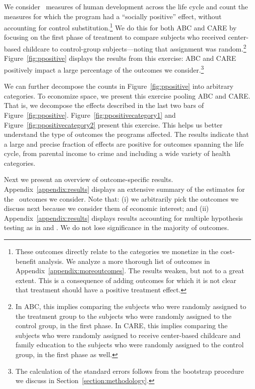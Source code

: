We consider \noutcomes\ measures of human development across the life cycle and count the measures for which the program had a ``socially positive'' effect, without accounting for control substitution.\footnote{These outcomes directly relate to the categories we monetize in the cost-benefit analysis. We analyze a more thorough list of outcomes in Appendix~\ref{appendix:moreoutcomes}. The results weaken, but not to a great extent. This is a consequence of adding outcomes for which it is not clear that treatment should have a positive treatment effect.} We do this for both ABC and CARE by focusing on the first phase of treatment to compare subjects who received center-based childcare to control-group subjects---noting that assignment was random.\footnote{In ABC, this implies comparing the subjects who were randomly assigned to the treatment group to the subjects who were randomly assigned to the control group, in the first phase. In CARE, this implies comparing the subjects who were randomly assigned to receive center-based childcare and family education to the subjects who were randomly assigned to the control group, in the first phase as well.} Figure~\ref{fig:ppositive} displays the results from this exercise: ABC and CARE positively impact a large percentage of the outcomes we consider.\footnote{The calculation of the standard errors follows from the bootstrap procedure we discuss in Section~\ref{section:methodology}.}

We can further decompose the counts in Figure~\ref{fig:ppositive} into arbitrary categories. To economize space, we present this exercise pooling ABC and CARE. That is, we decompose the effects described in the last two bars of Figure~\ref{fig:ppositive}. Figure~\ref{fig:ppositivecategory1} and Figure~\ref{fig:ppositivecategory2} present this exercise. This helps us better understand the type of outcomes the programs affected. The results indicate that a large and precise fraction of effects are positive for outcomes spanning the life cycle, from parental income to crime and including a wide variety of health categories.

Next we present an overview of outcome-specific results. Appendix~\ref{appendix:results} displays an extensive summary of the estimates for the \noutcomes\ outcomes we consider. Note that: (i) we arbitrarily pick the outcomes we discuss next because we consider them of economic interest; and (ii) Appendix~\ref{appendix:results} displays results accounting for multiple hypothesis testing as in \citet{Lehman_Romano_2005_AnnStat} and \citet{Romano_Shaikh_2006_AnnStat}. We do not lose significance in the majority of outcomes.

